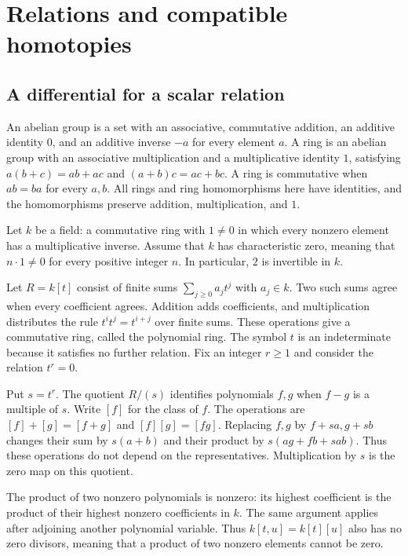 \chapter{Relations and compatible homotopies}
\label{chap:relations-homotopies}

\section{A differential for a scalar relation}

An abelian group is a set with an associative,
commutative addition, an additive identity $0$, and an additive inverse
$-a$ for every element $a$. A ring is an abelian group with an associative
multiplication and a multiplicative identity $1$, satisfying
$a(b+c)=ab+ac$ and $(a+b)c=ac+bc$.
A ring is commutative when $ab=ba$ for every $a,b$.
All rings and ring homomorphisms here have identities, and the
homomorphisms preserve addition, multiplication, and $1$.

Let $k$ be a field: a commutative ring with $1\ne0$ in which every
nonzero element has a multiplicative inverse. Assume that $k$ has
characteristic zero, meaning that $n\cdot1\ne0$ for every positive
integer $n$. In particular, $2$ is invertible in $k$.

Let $R=k[t]$ consist of finite sums $\sum_{j\geq0}a_jt^j$ with $a_j\in k$.
Two such sums agree when every coefficient agrees.
Addition adds coefficients, and multiplication distributes the rule
$t^it^j=t^{i+j}$ over finite sums.
These operations give a commutative ring, called the polynomial ring.
The symbol $t$ is an indeterminate because it satisfies no further relation.
Fix an integer $r\geq1$ and consider the relation $t^r=0$.

Put $s=t^r$. The quotient $R/(s)$ identifies polynomials $f,g$ when
$f-g$ is a multiple of $s$. Write $[f]$ for the class of $f$.
The operations are $[f]+[g]=[f+g]$ and $[f][g]=[fg]$.
Replacing $f,g$ by $f+sa,g+sb$ changes their sum by $s(a+b)$
and their product by $s(ag+fb+sab)$.
Thus these operations do not depend on the representatives.
Multiplication by $s$ is the zero map on this quotient.


The product of two nonzero polynomials is nonzero: its highest
coefficient is the product of their highest nonzero coefficients in $k$.
The same argument applies after adjoining another polynomial variable.
Thus $k[t,u]=k[t][u]$ also has no zero divisors, meaning that a product
of two nonzero elements cannot be zero.

